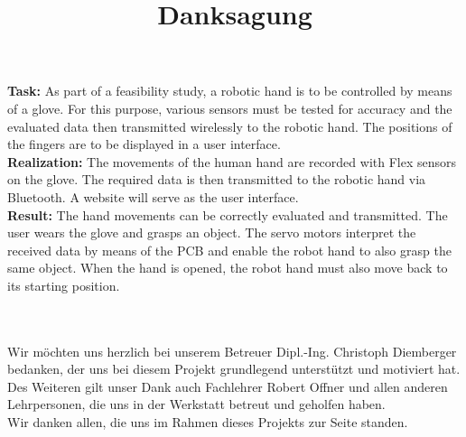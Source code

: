 \documentclass[11pt]{article}
\begin{document}
\textbf{Task:} 
As part of a feasibility study, a robotic hand is to be controlled by means of a glove. For
this purpose, various sensors must be tested for accuracy and the evaluated data then
transmitted wirelessly to the robotic hand. The positions of the fingers are to be displayed in a
user interface. \\
\textbf{Realization:} 
The movements of the human hand are recorded with Flex sensors on the glove.
The required data is then transmitted to the robotic hand via Bluetooth. A website will serve as
the user interface. \\
\textbf{Result:} 
The hand movements can be correctly evaluated and transmitted. The user wears the
glove and grasps an object. The servo motors interpret the received data by means of the PCB
and enable the robot hand to also grasp the same object. When the hand is opened, the robot
hand must also move back to its starting position. \\
\\

\pagebreak


\thispagestyle{empty}

\begin{center}

	\hfill \break
	\hfill \break
	\title{\textbf{\LARGE{Danksagung}}}	
	\maketitle

\end{center}

\hfill \break
\\
Wir möchten uns herzlich bei unserem Betreuer Dipl.-Ing. Christoph Diemberger bedanken, 
der uns bei diesem Projekt grundlegend unterstützt und motiviert hat. 
\hfill \break
\\
Des Weiteren gilt unser Dank auch Fachlehrer Robert Offner und allen anderen Lehrpersonen, 
die uns in der Werkstatt betreut und geholfen haben.
\hfill \break
\\
Wir danken allen, die uns im Rahmen dieses Projekts zur Seite standen.
\end{document}
